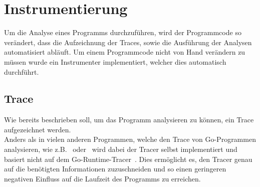 \chapter{Instrumentierung}\label{Chap:Instrumenter}
Um die Analyse eines Programms durchzuführen, wird der Programmcode 
so verändert, dass die Aufzeichnung der Traces, sowie die Ausführung 
der Analysen automatisiert abläuft. Um einem Programmcode nicht von Hand 
verändern zu müssen wurde ein Instrumenter implementiert, welcher dies 
automatisch durchführt.

\section{Trace}\label{Chap:Instrumenter-Sec:Trace}
Wie bereits beschrieben soll, um das 
Programm analysieren zu können, ein Trace aufgezeichnet werden.\\
Anders als in vielen anderen Programmen, welche den Trace von Go-Programmen
analysieren, wie z.B.~\cite{GoAt2} oder~\cite{GoVis} wird dabei der Tracer 
selbst implementiert und basiert nicht auf dem Go-Runtime-Tracer~\cite{GoRunTrace}. 
Dies ermöglicht es, den Tracer genau auf die benötigten Informationen zuzuschneiden
und so einen geringeren negativen Einfluss auf die Laufzeit des Programms zu erreichen.

